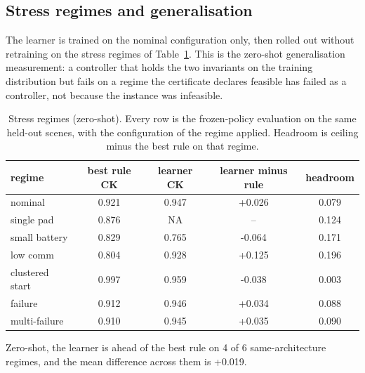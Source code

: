 \subsection{Stress regimes and generalisation}
\label{sec:results_stress}

The learner is trained on the nominal configuration only, then rolled out
without retraining on the stress regimes of Table~\ref{tab:stress}.  This is
the zero-shot generalisation measurement: a controller that holds the two
invariants on the training distribution but fails on a regime the certificate
declares feasible has failed as a controller, not because the instance was
infeasible.

\begin{table}[t]
\caption{Stress regimes (zero-shot).  Every row is the frozen-policy
evaluation on the same held-out scenes, with the configuration of the regime
applied.  Headroom is ceiling minus the best rule on that regime.}
\label{tab:stress}
\centering
\scriptsize
\setlength{\tabcolsep}{3pt}
\begin{tabular}{@{}lcccc@{}}
\toprule
regime & best rule CK & learner CK & learner minus rule & headroom \\
\midrule
nominal        & 0.921 & 0.947 & +0.026 & 0.079 \\
single pad     & 0.876 & NA & -- & 0.124 \\
small battery  & 0.829 & 0.765 & -0.064 & 0.171 \\
low comm       & 0.804 & 0.928 & +0.125 & 0.196 \\
clustered start & 0.997 & 0.959 & -0.038 & 0.003 \\
failure        & 0.912 & 0.946 & +0.034 & 0.088 \\
multi-failure  & 0.910 & 0.945 & +0.035 & 0.090 \\
\bottomrule
\end{tabular}
\end{table}

Zero-shot, the learner is ahead of the best rule on 4 of 6 same-architecture regimes, and the mean difference across them is +0.019.



